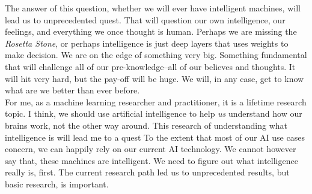 \documentclass[]{article}
\begin{document}
The answer of this question, whether we will ever have intelligent machines,
will lead us to unprecedented quest. That will question our own intelligence,
our feelings, and everything we once thought is human. Perhaps we are missing the
\textit{Rosetta Stone}, or perhaps intelligence is just deep layers that uses
weights to make decision. We are on the edge of something very big. Something
fundamental that will challenge all of our pre-knowledge--all of our believes
and thoughts. It will hit very hard, but the pay-off will be huge. We will, in
any case, get to know what are we better than ever before. \\

For me, as a machine learning researcher and practitioner, it is a lifetime
research topic. I think, we should use artificial intelligence to help
\textit{us} understand how our brains work, not the other way around. This
research of understanding what intelligence is will lead me to a quest
To the extent that most of our AI use cases concern, we can happily rely on our
current AI technology. We cannot however say that, these machines are
intelligent. We need to figure out what intelligence really is, first. The
current research path led us to unprecedented results, but basic research, is
important.


\end{document}
